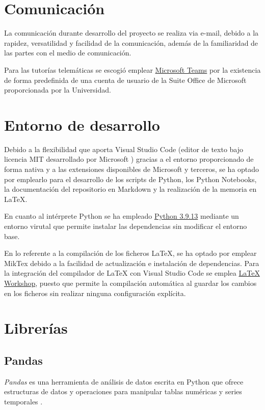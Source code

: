 \section{Comunicación}
La comunicación durante desarrollo del proyecto se realiza via e-mail, debido a la rapidez,
versatilidad y facilidad de la comunicación, además de la familiaridad de las partes con el 
medio de comunicación.

Para las tutorías telemáticas se escogió emplear 
\href{https://www.microsoft.com/es-es/microsoft-teams/log-in}{Microsoft Teams} por la existencia 
de forma predefinida de una cuenta de usuario de la Suite Office de Microsoft proporcionada
por la Universidad.

\section{Entorno de desarrollo}
Debido a la flexibilidad que aporta Visual Studio Code (editor de texto bajo licencia MIT desarrollado por Microsoft \cite{enwiki:vscode2023})
gracias a el entorno proporcionado de forma nativa y a las extensiones disponibles de Microsoft y terceros, se ha optado
por emplearlo para el desarrollo de los scripts de Python, los Python Notebooks, la documentación del repositorio
en Markdown y la realización de la memoria en LaTeX. 

En cuanto al intérprete Python se ha empleado \href{https://www.python.org/downloads/release/python-3913/}{Python 3.9.13} mediante un entorno virutal que permite instalar
las dependencias sin modificar el entorno base.

En lo referente a la compilación de los ficheros LaTeX, se ha optado por emplear 
MikTex debido a la facilidad de actualización e instalación de dependencias.
Para la integración del compilador de LaTeX con Visual Studio Code se emplea 
\href{https://marketplace.visualstudio.com/items?itemName=James-Yu.latex-workshop}{LaTeX Workshop}, 
puesto que permite la compilación automática al guardar los cambios en los ficheros sin realizar
ninguna configuración explícita.

\section{Librerías}
\subsection{Pandas}
\textit{Pandas} es una herramienta de análisis de datos escrita en Python que ofrece estructuras 
de datos y operaciones para manipular tablas numéricas y series temporales 
\cite{eswiki:pandas2023}.


